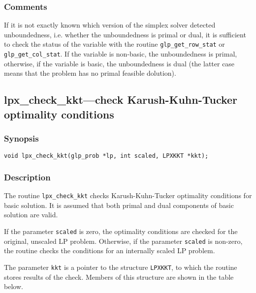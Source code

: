 \subsubsection*{Comments}

If it is not exactly known which version of the simplex solver
detected unboundedness, i.e. whether the unboundedness is primal or
dual, it is sufficient to check the status of the variable
with the routine \verb|glp_get_row_stat| or \verb|glp_get_col_stat|.
If the variable is non-basic, the unboundedness is primal, otherwise,
if the variable is basic, the unboundedness is dual (the latter case
means that the problem has no primal feasible dolution).

\subsection{lpx\_check\_kkt---check Karush-Kuhn-Tucker optimality
conditions}

\subsubsection*{Synopsis}

\begin{verbatim}
void lpx_check_kkt(glp_prob *lp, int scaled, LPXKKT *kkt);
\end{verbatim}

\subsubsection*{Description}

The routine \verb|lpx_check_kkt| checks Karush-Kuhn-Tucker optimality
conditions for basic solution. It is assumed that both primal and dual
components of basic solution are valid.

If the parameter \verb|scaled| is zero, the optimality conditions are
checked for the original, unscaled LP problem. Otherwise, if the
parameter \verb|scaled| is non-zero, the routine checks the conditions
for an internally scaled LP problem.

The parameter \verb|kkt| is a pointer to the structure \verb|LPXKKT|,
to which the routine stores results of the check. Members of this
structure are shown in the table below.

